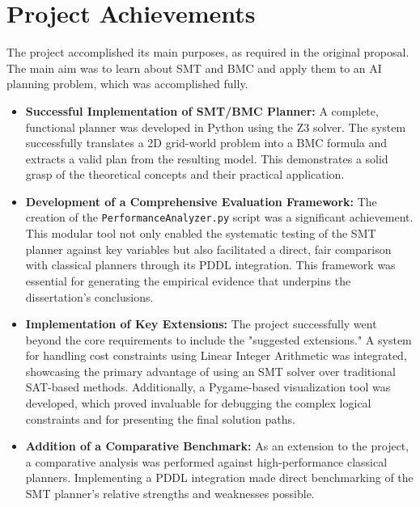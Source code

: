 \documentclass[12pt, a4paper, oneside]{report} %
\begin{document}
\section{Project Achievements}
The project accomplished its main purposes, as required in the original proposal. The main aim was to learn about SMT and BMC and apply them to an AI planning problem, which was accomplished fully.
\begin{itemize}
    \item \textbf{Successful Implementation of SMT/BMC Planner:} A complete, functional planner was developed in Python using the Z3 solver. The system successfully translates a 2D grid-world problem into a BMC formula and extracts a valid plan from the resulting model. This demonstrates a solid grasp of the theoretical concepts and their practical application.
    \item \textbf{Development of a Comprehensive Evaluation Framework:} The creation of the \texttt{PerformanceAnalyzer.py} script was a significant achievement. This modular tool not only enabled the systematic testing of the SMT planner against key variables but also facilitated a direct, fair comparison with classical planners through its PDDL integration. This framework was essential for generating the empirical evidence that underpins the dissertation's conclusions.
    \item \textbf{Implementation of Key Extensions:} The project successfully went beyond the core requirements to include the "suggested extensions." A system for handling cost constraints using Linear Integer Arithmetic was integrated, showcasing the primary advantage of using an SMT solver over traditional SAT-based methods. Additionally, a Pygame-based visualization tool was developed, which proved invaluable for debugging the complex logical constraints and for presenting the final solution paths.
    \item \textbf{Addition of a Comparative Benchmark:} As an extension to the project, a comparative analysis was performed against high-performance classical planners. Implementing a PDDL integration made direct benchmarking of the SMT planner’s relative strengths and weaknesses possible.
\end{itemize}
\end{document}
